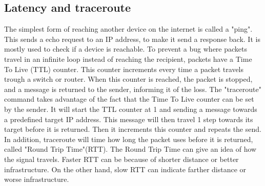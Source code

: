 \subsection{Latency and traceroute}
The simplest form of reaching another device on the internet is called a "ping". This sends a echo request to an IP address, to make it send a response back. It is mostly used to check if a device is reachable. To prevent a bug where packets travel in an infinite loop instead of reaching the recipient, packets have a Time To Live (TTL) counter. This counter increments every time a packet travels trough a switch or router. When this counter is reached, the packet is stopped, and a message is returned to the sender, informing it of the loss.
The "traceroute" command takes advantage of the fact that the Time To Live counter can be set by the sender. It will start the TTL counter at 1 and sending a message towards a predefined target IP address. This message will then travel 1 step towards its target before it is returned. Then it increments this counter and repeats the send. In addition, traceroute will time how long the packet uses before it is returned, called "Round Trip Time"(RTT).
The Round Trip Time can give an idea of how the signal travels. Faster RTT can be because of shorter distance or better infrastructure. On the other hand, slow RTT can indicate farther distance or worse infrastructure.




\newpage
